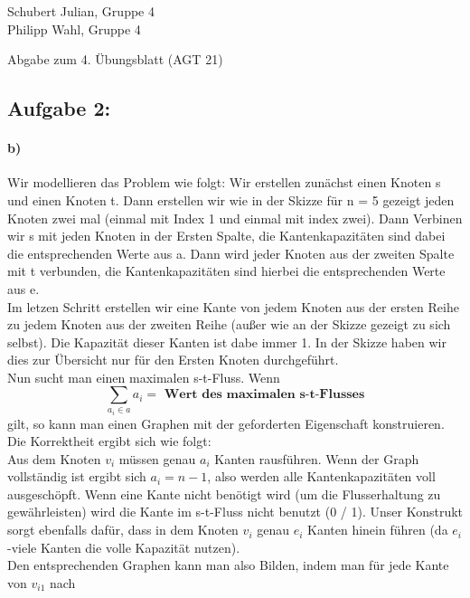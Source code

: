 \documentclass[a4paper]{article}
\begin{document}
\begin{small}
    \noindent
    Schubert Julian, Gruppe 4 \\
    Philipp Wahl, Gruppe 4
\end{small}
\bigskip

\begin{center}
    \LARGE Abgabe zum 4. Übungsblatt (AGT 21)
\end{center}
\smallskip

\subsection*{Aufgabe 2:}

\paragraph{b)}
Wir modellieren das Problem wie folgt: Wir erstellen zunächst einen Knoten s und einen Knoten
t. Dann erstellen wir wie in der Skizze für n = 5 gezeigt jeden Knoten zwei mal (einmal mit
Index 1 und einmal mit index zwei). Dann Verbinen wir s mit jeden Knoten in der Ersten Spalte,
die Kantenkapazitäten sind dabei die entsprechenden Werte aus a. Dann wird jeder Knoten aus
der zweiten Spalte mit t verbunden, die Kantenkapazitäten sind hierbei die entsprechenden
Werte aus e. \\
Im letzen Schritt erstellen wir eine Kante von jedem Knoten aus der ersten Reihe zu jedem
Knoten aus der zweiten Reihe (außer wie an der Skizze gezeigt zu sich selbst). Die
Kapazität dieser Kanten ist dabe immer 1. In der Skizze haben wir dies zur Übersicht
nur für den Ersten Knoten durchgeführt. \\
Nun sucht man einen maximalen s-t-Fluss. Wenn
\[
    \sum_{a_i \in a} a_i = \textbf{ Wert des maximalen s-t-Flusses}
\]
gilt, so kann man einen Graphen mit der geforderten Eigenschaft konstruieren. \\
Die Korrektheit ergibt sich wie folgt: \\
Aus dem Knoten $v_i$ müssen genau $a_i$ Kanten rausführen. Wenn der Graph vollständig ist
ergibt sich $a_i = n - 1$, also werden alle Kantenkapazitäten voll ausgeschöpft. Wenn eine
Kante nicht benötigt wird (um die Flusserhaltung zu gewährleisten) wird die Kante im
s-t-Fluss nicht benutzt (0 / 1). Unser Konstrukt sorgt ebenfalls dafür, dass in dem Knoten
$v_i$ genau $e_i$ Kanten hinein führen (da $e_i$-viele Kanten die volle Kapazität nutzen). \\
Den entsprechenden Graphen kann man also Bilden, indem man für jede Kante von $v_{i1}$ nach
\end{document}
